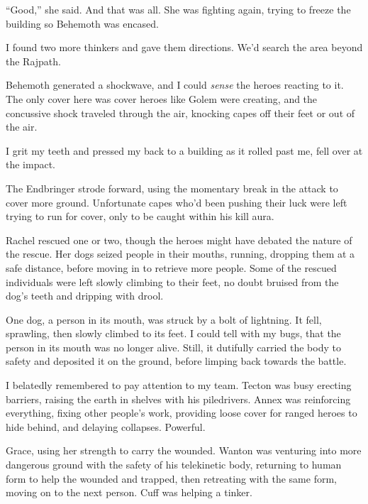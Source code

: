 ``Good,'' she said.  And that was all.  She was fighting again, trying to freeze the building so Behemoth was encased.



I found two more thinkers and gave them directions.  We'd search the area beyond the Rajpath.



Behemoth generated a shockwave, and I could \emph{sense} the heroes reacting to it.  The only cover here was cover heroes like Golem were creating, and the concussive shock traveled through the air, knocking capes off their feet or out of the air.



I grit my teeth and pressed my back to a building as it rolled past me, fell over at the impact.



The Endbringer strode forward, using the momentary break in the attack to cover more ground.  Unfortunate capes who'd been pushing their luck were left trying to run for cover, only to be caught within his kill aura.



Rachel rescued one or two, though the heroes might have debated the nature of the rescue.  Her dogs seized people in their mouths, running, dropping them at a safe distance, before moving in to retrieve more people.  Some of the rescued individuals were left slowly climbing to their feet, no doubt bruised from the dog's teeth and dripping with drool.



One dog, a person in its mouth, was struck by a bolt of lightning.  It fell, sprawling, then slowly climbed to its feet.  I could tell with my bugs, that the person in its mouth was no longer alive.  Still, it dutifully carried the body to safety and deposited it on the ground, before limping back towards the battle.



I belatedly remembered to pay attention to my team.  Tecton was busy erecting barriers, raising the earth in shelves with his piledrivers. Annex was reinforcing everything, fixing other people's work, providing loose cover for ranged heroes to hide behind, and delaying collapses.  Powerful.



Grace, using her strength to carry the wounded.  Wanton was venturing into more dangerous ground with the safety of his telekinetic body, returning to human form to help the wounded and trapped, then retreating with the same form, moving on to the next person.  Cuff was helping a tinker.



